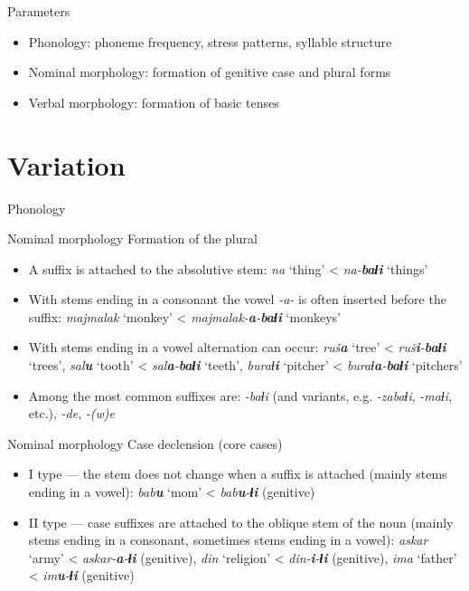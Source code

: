 \begin{frame}{Parameters}
\begin{itemize}
    \item Phonology: phoneme frequency, stress patterns, syllable structure
    \item Nominal morphology: formation of genitive case and plural forms
    \item Verbal morphology: formation of basic tenses
\end{itemize}
\end{frame}

\section{Variation}

\begin{frame}{Phonology}
    
\end{frame}

\begin{frame}{Nominal morphology}
Formation of the plural
\begin{itemize}
    \item A suffix is attached to the absolutive stem: \textit{na} `thing' < \textit{na-\textbf{baɬi}} `things'
    \item With stems ending in a consonant the vowel \textit{-a-} is often inserted before the suffix: \textit{majmalak}  `monkey' < \textit{majmalak-\textbf{a}-\textbf{baɬi}} `monkeys'
    \item With stems ending in a vowel alternation can occur: \textit{ruš\textbf{a}}  `tree' < \textit{ruš\textbf{i}-\textbf{baɬi}} `trees', \textit{sal\textbf{u}}  `tooth' < \textit{sal\textbf{a}-\textbf{baɬi}} `teeth', \textit{buraɬ\textbf{i}}  `pitcher' < \textit{buraɬ\textbf{a}-\textbf{baɬi}} `pitchers'
    \item Among the most common suffixes are: \textit{-baɬi} (and variants, e.g. \textit{-zabaɬi}, \textit{-maɬi}, etc.), \textit{-de}, \textit{-(w)e}
\end{itemize}
\end{frame}

\begin{frame}{Nominal morphology}
Case declension (core cases)
\begin{itemize}
    \item I type --- the stem does not change when a suffix is attached (mainly stems ending in a vowel): \textit{bab\textbf{u}} `mom' < \textit{bab\textbf{u}-\textbf{ɬi}} (genitive)  
    \item II type --- case suffixes are attached to the oblique stem of the noun (mainly stems ending in a consonant, sometimes stems ending in a vowel): \textit{askar} `army' < \textit{askar-\textbf{a}-\textbf{ɬi}} (genitive), \textit{din} `religion' < \textit{din-\textbf{i}-\textbf{ɬi}} (genitive), \textit{ima} `father' < \textit{im\textbf{u}-\textbf{ɬi}} (genitive) 
\end{itemize}
\end{frame}


